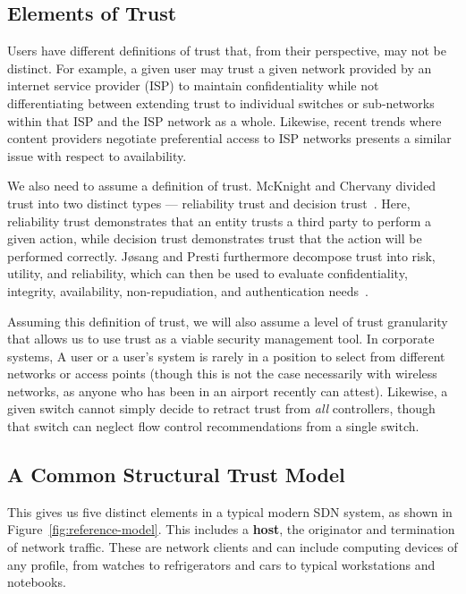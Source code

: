 \documentclass[10pt,conference]{IEEEtran}
\begin{document}
\subsection{Elements of Trust}
\label{sec:elements}
Users have different definitions of trust that, from their perspective, may not be distinct.  For example, a given user may trust a given network provided by an internet service provider (ISP) to maintain confidentiality while not differentiating between extending trust to individual switches or sub-networks within that ISP and the ISP network as a whole.  Likewise, recent trends where content providers negotiate preferential access to ISP networks presents a similar issue with respect to availability.

We also need to assume a definition of trust.  McKnight and Chervany divided trust into two distinct types --- reliability trust and decision trust~\cite{McCh:96}.  Here, reliability trust demonstrates that an entity trusts a third party to perform a given action, while decision trust demonstrates trust that the action will be performed correctly.  J{\o}sang and Presti furthermore decompose trust into risk, utility, and reliability, which can then be used to evaluate confidentiality, integrity, availability, non-repudiation, and authentication needs~\cite{JoPr:04,Wi:93}.

Assuming this definition of trust, we will also assume a level of trust granularity that allows us to use trust as a viable security management tool.  In corporate systems, A user or a user's system is rarely in a position to select from different networks or access points (though this is not the case necessarily with wireless networks, as anyone who has been in an airport recently can attest).  Likewise, a given switch cannot simply decide to retract trust from {\sl all} controllers, though that switch can neglect flow control recommendations from a single switch.

\subsection{A Common Structural Trust Model}
This gives us five distinct elements in a typical modern SDN system, as shown in Figure~\ref{fig:reference-model}.  This includes a {\bf host}, the originator and termination of network traffic.  These are network clients and can include computing devices of any profile, from watches to refrigerators and cars to typical workstations and notebooks.
\end{document}
